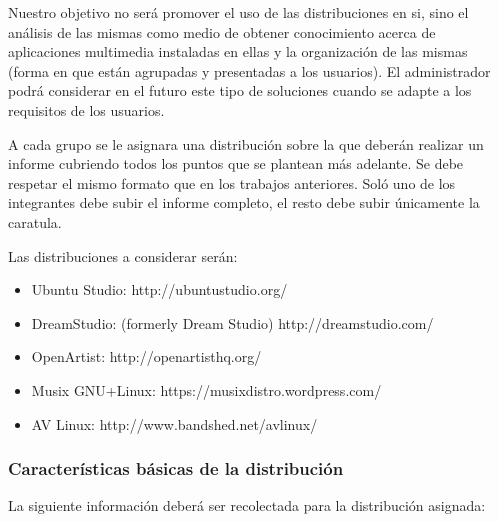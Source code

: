 \documentclass[12pt]{article}
\begin{document}
Nuestro objetivo no será promover el uso de las distribuciones en si, sino el
análisis de las mismas como medio de obtener conocimiento acerca de
aplicaciones multimedia instaladas en ellas y la organización de las mismas
(forma en que están agrupadas y presentadas a los usuarios). El administrador
podrá considerar en el futuro este tipo de soluciones cuando se adapte a los
requisitos de los usuarios.

A cada grupo se le asignara una distribución sobre la que deberán realizar un
informe cubriendo todos los puntos que se plantean más adelante. Se debe
respetar el mismo formato que en los trabajos anteriores. Soló uno de los
integrantes debe subir el informe completo, el resto debe subir únicamente la
caratula.

Las distribuciones a considerar serán:

\begin{itemize}

    \item Ubuntu Studio: http://ubuntustudio.org/

    \item DreamStudio: (formerly Dream Studio) http://dreamstudio.com/

    \item OpenArtist: http://openartisthq.org/

    \item Musix GNU+Linux: https://musixdistro.wordpress.com/

    \item AV Linux: http://www.bandshed.net/avlinux/

\end{itemize}

\subsubsection{Características básicas de la distribución}

La siguiente información deberá ser recolectada para la distribución asignada:
\end{document}
